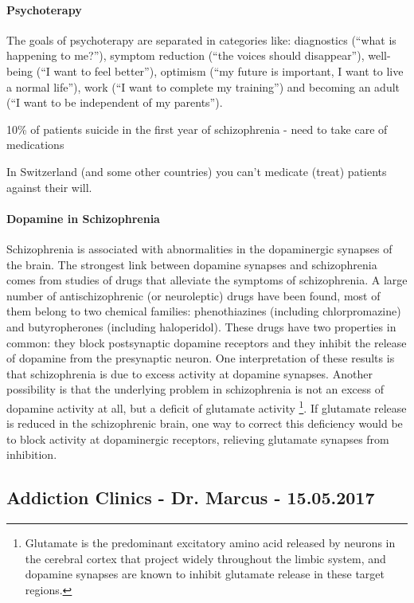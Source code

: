 \documentclass[12pt,article,oneside,a4paper]{memoir}
\begin{document}
\paragraph{Psychoterapy}
The goals of psychoterapy are separated in categories like: diagnostics (``what
is happening to me?''), symptom reduction (``the voices should disappear''), 
well-being (``I want to feel better''), optimism (``my future is important, I 
want to live a normal life''), work (``I want to complete my training'') and 
becoming an adult (``I want to be independent of my parents'').

10\% of patients suicide in the first year of schizophrenia - need to take care
of medications

In Switzerland (and some other countries) you can't medicate (treat) patients
against their will.

\paragraph{Dopamine in Schizophrenia}
Schizophrenia is associated with abnormalities in the dopaminergic synapses of
the brain. The strongest link between dopamine synapses and schizophrenia comes
from studies of drugs that alleviate the symptoms of schizophrenia.
A large number of antischizophrenic (or neuroleptic) drugs have been found,
most of them belong to two chemical families: phenothiazines (including
chlorpromazine) and butyropherones (including haloperidol). These drugs have two
properties in common: they block postsynaptic dopamine receptors and they
inhibit the release of dopamine from the presynaptic neuron. One interpretation
of these results is that schizophrenia is due to excess activity at dopamine
synapses. Another possibility is that the underlying problem in schizophrenia
is not an excess of dopamine activity at all, but a deficit of glutamate activity
\footnote{Glutamate is the predominant excitatory amino acid released by neurons
in the cerebral cortex that project widely throughout the limbic system, and
dopamine synapses are known to inhibit glutamate release in these target regions.}.
If glutamate release is reduced in the schizophrenic brain, one way to correct
this deficiency would be to block activity at dopaminergic receptors, relieving
glutamate synapses from inhibition.

\newpage
\subsection{Addiction Clinics - Dr. Marcus - 15.05.2017}
\end{document}
